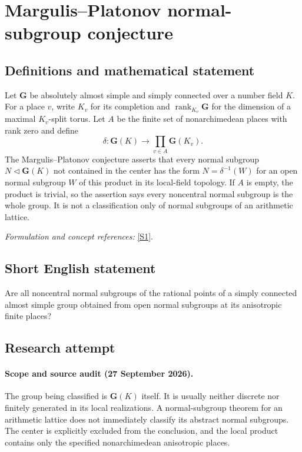 \documentclass[11pt]{article}
\begin{document}
\section*{\texorpdfstring{Margulis–Platonov normal-subgroup conjecture}{Margulis–Platonov normal-subgroup conjecture}}\label{30006901}
\subsection{Definitions and mathematical statement}
Let $\mathbf G$ be absolutely almost simple and simply connected over a number field $K$. For a place $v$, write $K_v$ for its completion and $\operatorname{rank}_{K_v}\mathbf G$ for the dimension of a maximal $K_v$-split torus. Let $A$ be the finite set of nonarchimedean places with rank zero and define
\[
 \delta:\mathbf G(K)\longrightarrow\prod_{v\in A}\mathbf G(K_v).
\]
The Margulis--Platonov conjecture asserts that every normal subgroup $N\triangleleft\mathbf G(K)$ not contained in the center has the form $N=\delta^{-1}(W)$ for an open normal subgroup $W$ of this product in its local-field topology. If $A$ is empty, the product is trivial, so the assertion says every noncentral normal subgroup is the whole group. It is not a classification only of normal subgroups of an arithmetic lattice.
\par\smallskip\textit{Formulation and concept references:} \href{https://arxiv.org/html/2603.27472}{[S1]}.

\subsection{Short English statement}
Are all noncentral normal subgroups of the rational points of a simply connected almost simple group obtained from open normal subgroups at its anisotropic finite places?
\subsection{Research attempt}
\paragraph{Scope and source audit (27 September 2026).}
The group being classified is $\mathbf G(K)$ itself. It is usually
neither discrete nor finitely generated in its local realizations.
A normal-subgroup theorem for an arithmetic lattice does not immediately
classify its abstract normal subgroups. The center is explicitly excluded
from the conclusion, and the local product contains only the specified
nonarchimedean anisotropic places.
\end{document}
